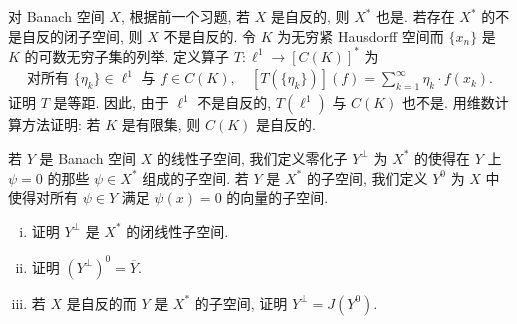 \documentclass[../../main.tex]{subfiles}
\begin{document}
\begin{exercise}\label{exercise:ch15-11}
对 Banach 空间 $X$, 根据前一个习题, 若 $X$ 是自反的, 则 $X^{*}$ 也是. 若存在 $X^{*}$ 的不是自反的闭子空间, 则 $X$ 不是自反的. 令 $K$ 为无穷紧 Hausdorff 空间而 $\{x_{n}\}$ 是 $K$ 的可数无穷子集的列举. 定义算子 $T:\ell^{1}\to[C(K)]^{*}$ 为
\begin{align*}
\text{对所有 }\{\eta_{k}\}\in\ell^{1}\text{ 与 }f\in C(K),\quad[T(\{\eta_{k}\})](f)=\sum_{k=1}^{\infty}\eta_{k}\cdot f(x_{k}).
\end{align*}
证明 $T$ 是等距. 因此, 由于 $\ell^{1}$ 不是自反的, $T(\ell^{1})$ 与 $C(K)$ 也不是. 用维数计算方法证明: 若 $K$ 是有限集, 则 $C(K)$ 是自反的.
\end{exercise}

\begin{exercise}\label{exercise:ch15-12}
若 $Y$ 是 Banach 空间 $X$ 的线性子空间, 我们定义零化子 $Y^{\perp}$ 为 $X^{*}$ 的使得在 $Y$ 上 $\psi=0$ 的那些 $\psi\in X^{*}$ 组成的子空间. 若 $Y$ 是 $X^{*}$ 的子空间, 我们定义 $Y^{0}$ 为 $X$ 中使得对所有 $\psi\in Y$ 满足 $\psi(x)=0$ 的向量的子空间.
\begin{enumerate}[(i)]
\item 证明 $Y^{\perp}$ 是 $X^{*}$ 的闭线性子空间.
\item 证明 $(Y^{\perp})^{0}=\overline{Y}$.
\item 若 $X$ 是自反的而 $Y$ 是 $X^{*}$ 的子空间, 证明 $Y^{\perp}=J(Y^{0})$.
\end{enumerate}
\end{exercise}
\end{document}
